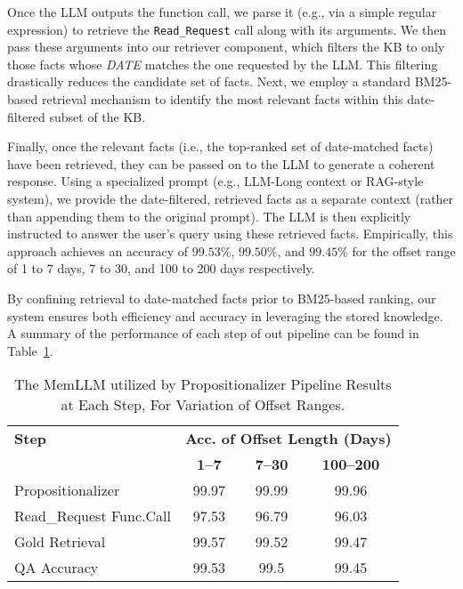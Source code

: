 \documentclass[11pt]{article}
\begin{document}
Once the LLM outputs the function call, we parse it (e.g., via a simple regular expression) to retrieve the \texttt{Read\_Request} call along with its arguments. We then pass these arguments into our retriever component, which filters the KB to only those facts whose \textit{DATE} matches the one requested by the LLM. This filtering drastically reduces the candidate set of facts. Next, we employ a standard BM25-based retrieval mechanism to identify the most relevant facts within this date-filtered subset of the KB.

Finally, once the relevant facts (i.e., the top-ranked set of date-matched facts) have been retrieved, they can be passed on to the LLM to generate a coherent response. Using a specialized prompt (e.g., LLM-Long context or RAG-style system), we provide the date-filtered, retrieved facts as a separate context (rather than appending them to the original prompt). The LLM is then explicitly instructed to answer the user’s query using these retrieved facts. Empirically, this approach achieves an accuracy of $99.53\%$, $99.50\%$, and $99.45\%$ for the offset range of 1 to 7 days, 7 to 30, and 100 to 200 days respectively.


By confining retrieval to date-matched facts prior to BM25-based ranking, our system ensures both efficiency and accuracy in leveraging the stored knowledge. A summary of the performance of each step of out pipeline can be found in Table~\ref{tab:memllm}.



\begin{table}[ht]
\centering
\caption{The MemLLM utilized by Propositionalizer Pipeline Results at Each Step, For Variation of Offset Ranges.}
\label{tab:memllm}
\begin{tabular}{l|ccc}
\hline
\textbf{Step} & \multicolumn{3}{c}{\small{\textbf{Acc. of Offset Length (Days)}}} \\
\cline{2-4}
 & \small{\textbf{1--7 }}  & \small{\textbf{7--30 }} & \small{\textbf{100--200 }} \\
\hline
Propositionalizer & 99.97 & 99.99 & 99.96 \\
Read\_Request \small{Func.Call} & 97.53 & 96.79 & 96.03 \\
Gold Retrieval  & 99.57 & 99.52 & 99.47 \\
QA Accuracy  & 99.53 & 99.5 & 99.45 \\
\hline
\end{tabular}
\end{table}

\cite{Aho:72}

\end{document}
